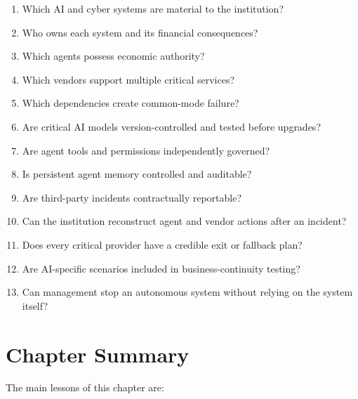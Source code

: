 \begin{enumerate}
    \item Which AI and cyber systems are material to the institution?
    \item Who owns each system and its financial consequences?
    \item Which agents possess economic authority?
    \item Which vendors support multiple critical services?
    \item Which dependencies create common-mode failure?
    \item Are critical AI models version-controlled and tested before upgrades?
    \item Are agent tools and permissions independently governed?
    \item Is persistent agent memory controlled and auditable?
    \item Are third-party incidents contractually reportable?
    \item Can the institution reconstruct agent and vendor actions after an incident?
    \item Does every critical provider have a credible exit or fallback plan?
    \item Are AI-specific scenarios included in business-continuity testing?
    \item Can management stop an autonomous system without relying on the system itself?
\end{enumerate}

\section{Chapter Summary}

The main lessons of this chapter are:

